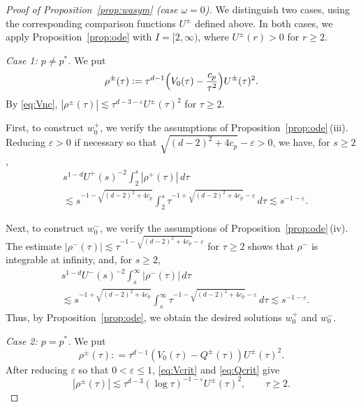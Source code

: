 \documentclass[12pt, a4paper, reqno]{amsart}
\numberwithin{equation}{section}
\theoremstyle{definition}
\theoremstyle{remark}
\newcommand{\ce}{\mathrel{\mathop:}=}
\begin{document}
\begin{proof}[Proof of Proposition~\ref{prop:wasym} \textup{(}case $\omega=0$\textup{)}]
We distinguish two cases, using the corresponding comparison
functions $U^\pm$ defined above. In both cases, we apply
Proposition~\ref{prop:ode} with $I=[2,\infty)$, where
$U^\pm(r)>0$ for $r\ge2$.

\smallskip
\noindent\textit{Case 1: $p\ne p^*$.} We put
\[
  \rho^\pm(\tau)
    \ce \tau^{d-1}\Bigl(V_0(\tau)-\frac{c_p}{\tau^2}\Bigr)U^\pm(\tau)^2.
\]
By \eqref{eq:Vnc},
$|\rho^\pm(\tau)|\lesssim \tau^{d-3-\varepsilon}U^\pm(\tau)^2$
for $\tau\ge2$.

First, to construct $w_0^+$, we verify the assumptions of
Proposition~\ref{prop:ode}\,\textup{(iii)}. Reducing $\varepsilon>0$
if necessary so that $\sqrt{(d-2)^2+4c_p}-\varepsilon>0$, we have,
for $s\ge2$,
\begin{align*}
   &s^{1-d}U^+(s)^{-2}\int_2^s |\rho^+(\tau)|\,d\tau
\\ &\lesssim s^{-1-\sqrt{(d-2)^2+4c_p}}
        \int_2^s \tau^{-1+\sqrt{(d-2)^2+4c_p}-\varepsilon}\,d\tau
    \lesssim s^{-1-\varepsilon}.
\end{align*}

Next, to construct $w_0^-$, we verify the assumptions of Proposition~\ref{prop:ode}\,\textup{(iv)}. The estimate $|\rho^-(\tau)|\lesssim \tau^{-1-\sqrt{(d-2)^2+4c_p}-\varepsilon}$ for $\tau\ge2$ shows that $\rho^-$ is integrable at infinity, and, for $s\ge2$,
\begin{align*}
   &s^{1-d}U^-(s)^{-2}\int_s^\infty |\rho^-(\tau)|\,d\tau
\\ &\lesssim s^{-1+\sqrt{(d-2)^2+4c_p}}
        \int_s^\infty \tau^{-1-\sqrt{(d-2)^2+4c_p}-\varepsilon}\,d\tau
    \lesssim s^{-1-\varepsilon}.
\end{align*}
Thus, by Proposition~\ref{prop:ode}, we obtain the desired solutions $w_0^+$ and $w_0^-$.

\smallskip
\noindent\textit{Case 2: $p=p^*$.} We put
\[
  \rho^\pm(\tau)
    \ce \tau^{d-1}(V_0(\tau)-Q^\pm(\tau))U^\pm(\tau)^2.
\]
After reducing $\varepsilon$ so that $0<\varepsilon\le1$,
\eqref{eq:Vcrit} and \eqref{eq:Qcrit} give
\[
  |\rho^\pm(\tau)|
  \lesssim \tau^{d-3}(\log \tau)^{-1-\varepsilon}U^\pm(\tau)^2,
  \qquad \tau\ge2.
\]


\end{proof}
\end{document}
